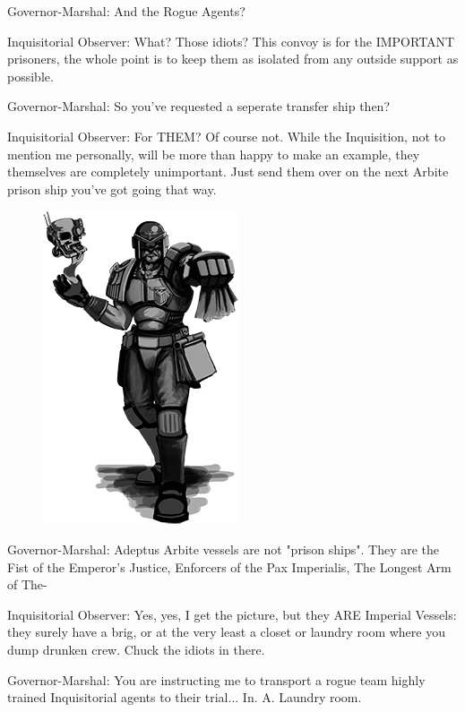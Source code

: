 Governor-Marshal: 
And the Rogue Agents?

Inquisitorial Observer: 
What? 
Those idiots? 
This convoy is for the IMPORTANT prisoners, the whole point is to keep them as isolated from any outside support as possible. 


Governor-Marshal: 
So you've requested a seperate transfer ship then?

Inquisitorial Observer: 
For THEM? 
Of course not. 
While the Inquisition, not to mention me personally, will be more than happy to make an example, they themselves are completely unimportant. 
Just send them over on the next Arbite prison ship you've got going that way.



\begin{figure}
	\begin{center}
		\includegraphics[width=\figwidth]{pics/20/4.png}
	\end{center}
\end{figure}



Governor-Marshal: 
Adeptus Arbite vessels are not "prison ships". 
They are the Fist of the Emperor's Justice, Enforcers of the Pax Imperialis, The Longest Arm of The-

Inquisitorial Observer: 
Yes, yes, I get the picture, but they ARE Imperial Vessels: 
they surely have a brig, or at the very least a closet or laundry room where you dump drunken crew. 
Chuck the idiots in there.

Governor-Marshal: 
You are instructing me to transport a rogue team highly trained Inquisitorial agents to their trial... 
In. 
A. 
Laundry room.

